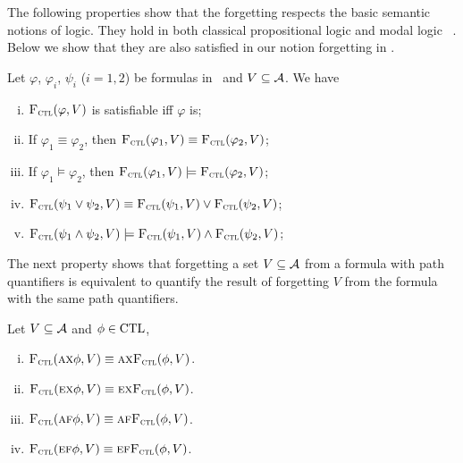 \documentclass{article}
\begin{document}
The following properties show that the forgetting respects the basic semantic notions of logic. They hold in both classical propositional logic and modal logic \SFive~\cite{Yan:AIJ:2009}. Below we show that they are also satisfied in our notion forgetting in \CTL.
\begin{proposition}\label{pro:ctl:forget:1}
Let $\varphi$, $\varphi_i$, $\psi_i$ ($i=1,2$) be formulas in \CTL\ and $V\subseteq {\cal A}$. We have
\begin{enumerate}[(i)]
  \item ${\textsc{F}_{\textsc{ctl}}}(\varphi, V)$ is satisfiable iff $\varphi$ is;
  \item If $\varphi_1 \equiv \varphi_2$, then ${\textsc{F}_{\textsc{ctl}}}(\varphi_1, V) \equiv {\textsc{F}_{\textsc{ctl}}}(\varphi_2, V)$;
  \item If $\varphi_1 \models \varphi_2$, then ${\textsc{F}_{\textsc{ctl}}}(\varphi_1, V) \models {\textsc{F}_{\textsc{ctl}}}(\varphi_2, V)$;
  \item ${\textsc{F}_{\textsc{ctl}}}(\psi_1 \vee \psi_2, V) \equiv {\textsc{F}_{\textsc{ctl}}}(\psi_1, V) \vee {\textsc{F}_{\textsc{ctl}}}(\psi_2, V)$;
  \item ${\textsc{F}_{\textsc{ctl}}}(\psi_1 \wedge \psi_2, V) \models {\textsc{F}_{\textsc{ctl}}}(\psi_1, V) \wedge {\textsc{F}_{\textsc{ctl}}}(\psi_2, V)$;
\end{enumerate}
\end{proposition}


The next property shows that forgetting a set $V\subseteq\cal A$ from a formula with path quantifiers is equivalent to quantify the result of forgetting $V$ from the formula with the same path quantifiers.
\begin{proposition}[Homogeneity]\label{pro:ctl:forget:2}
  Let $V\subseteq\cal A$ and $\phi \in \textrm{CTL}$,%
  \begin{enumerate}[(i)]
    \item ${\textsc{F}_{\textsc{ctl}}}(\textsc{a}\textsc{x}\phi,V)\equiv \textsc{a}\textsc{x} {\textsc{F}_{\textsc{ctl}}}(\phi,V)$.
    \item ${\textsc{F}_{\textsc{ctl}}}(\textsc{e}\textsc{x}\phi,V)\equiv\textsc{e}\textsc{x} {\textsc{F}_{\textsc{ctl}}}(\phi,V)$.
    \item ${\textsc{F}_{\textsc{ctl}}}(\textsc{a} \textsc{f}\phi,V)\equiv \textsc{a} \textsc{f} {\textsc{F}_{\textsc{ctl}}}(\phi,V)$.
    \item ${\textsc{F}_{\textsc{ctl}}}(\textsc{e}\textsc{f}\phi,V)\equiv\textsc{e}\textsc{f} {\textsc{F}_{\textsc{ctl}}}(\phi,V)$.
  \end{enumerate}
\end{proposition}
\end{document}

